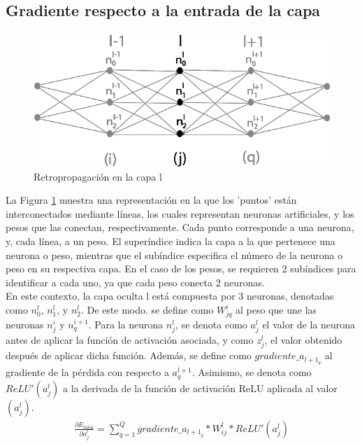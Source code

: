 \subsection{Gradiente respecto a la entrada de la capa}

\begin{figure}[H]
	\centering
	\includegraphics[scale=0.35]{imagenes/conclusion_capa_l.jpg}  
	\caption{Retropropagación en la capa l}
	\label{fig:conclusion_capa_l}
\end{figure}

La Figura \ref{fig:conclusion_capa_l} muestra una representación en la que los 'puntos' están interconectados mediante líneas, los cuales representan neuronas artificiales, y los pesos que las conectan, respectivamente. Cada punto corresponde a una neurona, y, cada línea, a un peso. El superíndice indica la capa a la que pertenece una neurona o peso, mientras que el subíndice especifica el número de la neurona o peso en su respectiva capa. En el caso de los pesos, se requieren 2 subíndices para identificar a cada uno, ya que cada peso conecta 2 neuronas. \\
En este contexto, la capa oculta l está compuesta por 3 neuronas, denotadas como $n^{l}_0$, $n^{l}_1$, y $n^{l}_2$. De este modo. se define como $W^{i}_{jq}$ al peso que une las neuronas $n^{i}_j$ y $n^{i+1}_q$. 
Para la neurona $n^l_j$, se denota como $a^l_j$ el valor de la neurona antes de aplicar la función de activación asociada, y como $z^l_j$, el valor obtenido después de aplicar dicha función. 
Además, se define como $gradiente\_a_{{l+1}_q}$ al gradiente de la pérdida con respecto a $a^{l+1}_q$. Asimismo, se denota como $ReLU'(a^l_j)$ a la derivada de la función de activación ReLU aplicada al valor $(a^l_j)$.\\

\begin{gather}
	\frac{\partial E_{total}}{\partial a^l_j} = \sum_{q=1}^Q  gradiente\_a_{{l+1}_q} * W^l_{ij} * ReLU'(a^l_j) \label{grad_input_l_4}
\end{gather}

